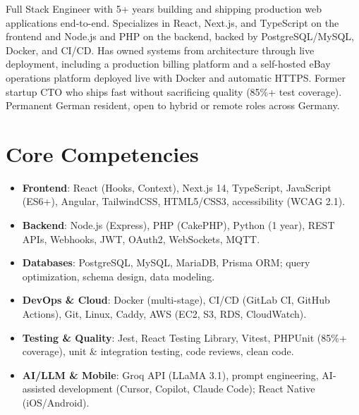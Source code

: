 \documentclass[11pt,a4paper,sans]{moderncv}
\begin{document}
\makecvtitle


\vspace{6pt}
\small{Full Stack Engineer with 5+ years building and shipping production web applications end-to-end. Specializes in React, Next.js, and TypeScript on the frontend and Node.js and PHP on the backend, backed by PostgreSQL/MySQL, Docker, and CI/CD. Has owned systems from architecture through live deployment, including a production billing platform and a self-hosted eBay operations platform deployed live with Docker and automatic HTTPS. Former startup CTO who ships fast without sacrificing quality (85\%+ test coverage). Permanent German resident, open to hybrid or remote roles across Germany.}


\section{Core Competencies}
\vspace{1pt}
\begin{itemize}

\item \textbf{Frontend}: React (Hooks, Context), Next.js 14, TypeScript, JavaScript (ES6+), Angular, TailwindCSS, HTML5/CSS3, accessibility (WCAG 2.1).

\item \textbf{Backend}: Node.js (Express), PHP (CakePHP), Python (1 year), REST APIs, Webhooks, JWT, OAuth2, WebSockets, MQTT.

\item \textbf{Databases}: PostgreSQL, MySQL, MariaDB, Prisma ORM; query optimization, schema design, data modeling.

\item \textbf{DevOps \& Cloud}: Docker (multi-stage), CI/CD (GitLab CI, GitHub Actions), Git, Linux, Caddy, AWS (EC2, S3, RDS, CloudWatch).

\item \textbf{Testing \& Quality}: Jest, React Testing Library, Vitest, PHPUnit (85\%+ coverage), unit \& integration testing, code reviews, clean code.

\item \textbf{AI/LLM \& Mobile}: Groq API (LLaMA 3.1), prompt engineering, AI-assisted development (Cursor, Copilot, Claude Code); React Native (iOS/Android).

\end{itemize}
\end{document}
